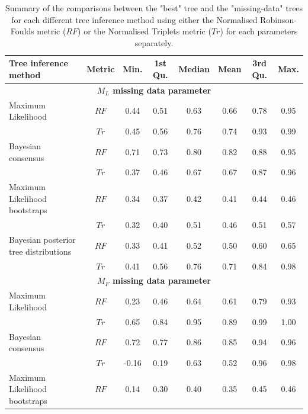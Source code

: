 \begin{landscape}
\begin{table}[!ht]
\caption[Summary of the tree comparisons for the $M_{L}$, $M_{F}$ and $N_{C}$ parameters]{Summary of the comparisons between the "best" tree and the "missing-data" trees for each different tree inference method using either the Normalised Robinson-Foulds metric ($RF$) or the Normalised Triplets metric ($Tr$) for each parameters separately.}
\label{Tab_Supp_summary_metric}
\centering
\begin{tabular}{lccccccc}
  \hline
 Tree inference method & Metric & Min. & 1st Qu. & Median & Mean & 3rd Qu. & Max. \\ 
  \hline
  \multicolumn{8}{c}{\textbf{$M_{L}$ missing data parameter}}\\
  \hline
  Maximum Likelihood                    & $RF$ & 0.44 & 0.51 & 0.63 & 0.66 & 0.78 & 0.95 \\ 
                                        & $Tr$ & 0.45 & 0.56 & 0.76 & 0.74 & 0.93 & 0.99 \\ 
  Bayesian consensus                    & $RF$ & 0.71 & 0.73 & 0.80 & 0.82 & 0.88 & 0.95 \\ 
                                        & $Tr$ & 0.37 & 0.46 & 0.67 & 0.67 & 0.87 & 0.96 \\ 
  Maximum Likelihood bootstraps         & $RF$ & 0.34 & 0.37 & 0.42 & 0.41 & 0.44 & 0.46 \\ 
                                        & $Tr$ & 0.32 & 0.40 & 0.51 & 0.46 & 0.51 & 0.57 \\ 
  Bayesian posterior tree distributions & $RF$ & 0.33 & 0.41 & 0.52 & 0.50 & 0.60 & 0.65 \\ 
                                        & $Tr$ & 0.41 & 0.56 & 0.76 & 0.71 & 0.84 & 0.98 \\ 
  \hline
  \multicolumn{8}{c}{\textbf{$M_{F}$ missing data parameter}}\\
  \hline
  Maximum Likelihood                    & $RF$ & 0.23 & 0.46 & 0.64 & 0.61 & 0.79 & 0.93 \\ 
                                        & $Tr$ & 0.65 & 0.84 & 0.95 & 0.89 & 0.99 & 1.00 \\ 
  Bayesian consensus                    & $RF$ & 0.72 & 0.77 & 0.86 & 0.85 & 0.94 & 0.96 \\ 
                                        & $Tr$ & -0.16 & 0.19 & 0.63 & 0.52 & 0.96 & 0.98 \\ 
  Maximum Likelihood bootstraps         & $RF$ & 0.14 & 0.30 & 0.40 & 0.35 & 0.45 & 0.46 \\ 

\end{tabular}
\end{table}
\end{landscape}
